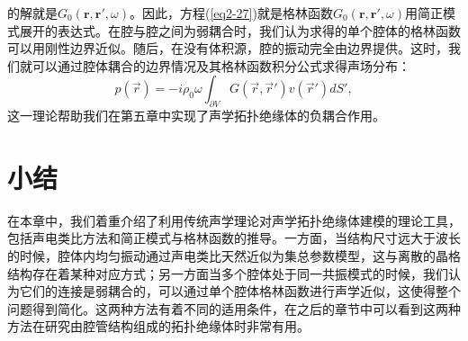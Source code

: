 的解就是$G_0(\mathbf{r}, \mathbf{r}', \omega)$。因此，方程(\ref{eq2-27})就是格林函数$G_0(\mathbf{r}, \mathbf{r}', \omega)$用简正模式展开的表达式。在腔与腔之间为弱耦合时，我们认为求得的单个腔体的格林函数可以用刚性边界近似。随后，在没有体积源，腔的振动完全由边界提供。这时，我们就可以通过腔体耦合的边界情况及其格林函数积分公式求得声场分布：
\begin{equation}\label{eq2-38}
    p(\vec{r}) = -i\rho_0\omega \int_{\partial V} G(\vec{r},\vec{r}')v(\vec{r}')dS',
\end{equation}
这一理论帮助我们在第五章中实现了声学拓扑绝缘体的负耦合作用。

\section{小结}
在本章中，我们着重介绍了利用传统声学理论对声学拓扑绝缘体建模的理论工具，包括声电类比方法和简正模式与格林函数的推导。一方面，当结构尺寸远大于波长的时候，腔体内均匀振动通过声电类比天然近似为集总参数模型，这与离散的晶格结构存在着某种对应方式；另一方面当多个腔体处于同一共振模式的时候，我们认为它们的连接是弱耦合的，可以通过单个腔体格林函数进行声学近似，这使得整个问题得到简化。这两种方法有着不同的适用条件，在之后的章节中可以看到这两种方法在研究由腔管结构组成的拓扑绝缘体时非常有用。
